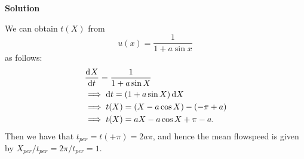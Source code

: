 \documentclass{article}
\begin{document}
\newpage

\textbf{Solution}

We can obtain $t(X)$ from
%
\begin{equation*}
    u(x) = \frac{1}{1 + a \sin x}
\end{equation*}
%
as follows:
%
\begin{align*}
    &\dod{X}{t} = \frac{1}{1 + a \sin X} \\
    &\implies \dif t = \del{1 + a \sin X} \dif X \\
    &\implies t(X) = \del{X - a \cos X} - \del{-\pi + a} \\
    &\implies t(X) = a X - a \cos X + \pi - a
    .
\end{align*}
%
Then we have that $t_{per} = t(+\pi) =  2 a \pi$, and hence the mean
flowspeed is given by $X_{per}/t_{per} = 2 \pi / t_{per} = 1$.
\end{document}

